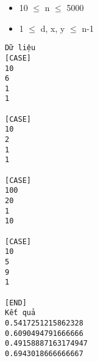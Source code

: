 \begin{itemize}
	\item     10  $\le$  n  $\le$  5000   
	\item     1  $\le$  d, x, y  $\le$  n-1   
\end{itemize}
\begin{verbatim}
Dữ liệu
[CASE]
10
6
1
1

[CASE]
10
2
1
1

[CASE]
100
20
1
10

[CASE]
10
5
9
1

[END]
Kết quả
0.5417251215862328
0.6090494791666666
0.49158887163174947
0.6943018666666667
\end{verbatim}